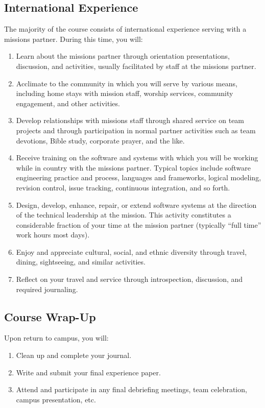 \documentclass[11pt]{article}
\begin{document}
\subsection{International Experience}

The majority of the course
consists of international experience serving with a missions partner.
During this time, you will:
\begin{enumerate}
\item
  Learn about the missions partner
  through orientation presentations, discussion, and activities,
  usually facilitated by staff at the missions partner.
\item
  Acclimate to the community in which you will serve
  by various means, including home stays with mission staff,
  worship services, community engagement, and other activities.
\item
  Develop relationships with missions staff
  through shared service on team pro\-jects
  and through participation in normal partner activities
  such as team devotions, Bible study, corporate prayer, and the like.
\item
  Receive training on the software and systems
  with which you will be working while in country
  with the missions partner.
  Typical topics include software engineering practice and process,
  languages and frameworks, logical modeling, revision control,
  issue tracking, continuous integration, and so forth.
\item
  Design, develop, enhance, repair, or extend software systems
  at the direction of the technical leadership at the mission.
  This activity constitutes a considerable fraction
  of your time at the mission partner
  (typically ``full time'' work hours most days).
\item
  Enjoy and appreciate cultural, social, and ethnic diversity
  through travel, dining, sightseeing, and similar activities.
\item
  Reflect on your travel and service
  through introspection, discussion, and required journaling.
\end{enumerate}

\subsection{Course Wrap-Up}

Upon return to campus, you will:
\begin{enumerate}
\item Clean up and complete your journal.
\item Write and submit your final experience paper.
\item Attend and participate in any final debriefing meetings,
  team celebration, campus presentation, etc.
\end{enumerate}
\end{document}
